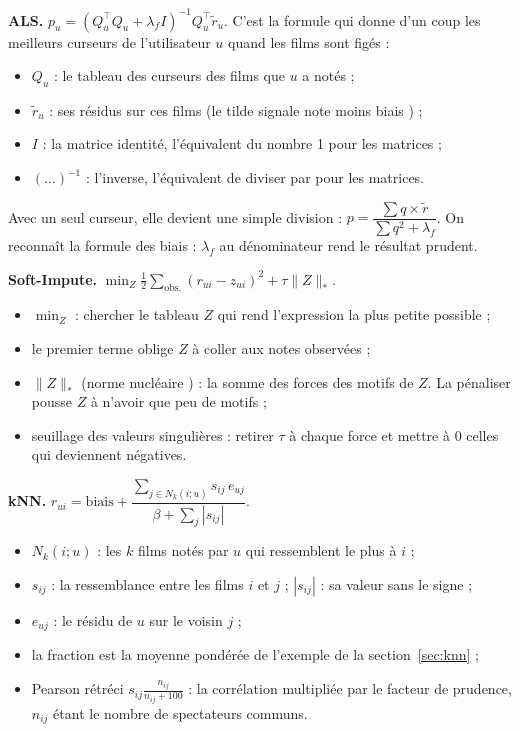 \documentclass[11pt,a4paper]{article}
\newcommand{\rhat}{\hat r}
\begin{document}
\textbf{ALS.} $p_u = (Q_u^\top Q_u + \lambda_f I)^{-1} Q_u^\top \tilde r_u$.
C'est la formule qui donne d'un coup les meilleurs curseurs de l'utilisateur $u$ quand
les films sont figés :
\begin{itemize}
  \item $Q_u$ : le tableau des curseurs des films que $u$ a notés ;
  \item $\tilde r_u$ : ses résidus sur ces films (le tilde signale \og note moins biais \fg) ;
  \item $I$ : la matrice identité, l'équivalent du nombre 1 pour les matrices ;
  \item $(\dots)^{-1}$ : l'inverse, l'équivalent de \og diviser par \fg pour les matrices.
\end{itemize}
Avec un seul curseur, elle devient une simple division :
$p = \dfrac{\sum q \times \tilde r}{\sum q^2 + \lambda_f}$. On reconnaît la formule des
biais : $\lambda_f$ au dénominateur rend le résultat prudent.

\textbf{Soft-Impute.} $\min_Z \tfrac12 \sum_{\text{obs.}} (r_{ui} - z_{ui})^2 + \tau \|Z\|_*$.
\begin{itemize}
  \item $\min_Z$ : chercher le tableau $Z$ qui rend l'expression la plus petite possible ;
  \item le premier terme oblige $Z$ à coller aux notes observées ;
  \item $\|Z\|_*$ (\og norme nucléaire \fg) : la somme des forces des motifs de $Z$. La
        pénaliser pousse $Z$ à n'avoir que peu de motifs ;
  \item \og seuillage des valeurs singulières \fg : retirer $\tau$ à chaque force et mettre
        à 0 celles qui deviennent négatives.
\end{itemize}

\textbf{kNN.} $\rhat_{ui} = \text{biais} + \dfrac{\sum_{j \in N_k(i;u)} s_{ij}\, e_{uj}}{\beta + \sum_j |s_{ij}|}$.
\begin{itemize}
  \item $N_k(i;u)$ : les $k$ films notés par $u$ qui ressemblent le plus à $i$ ;
  \item $s_{ij}$ : la ressemblance entre les films $i$ et $j$ ; $|s_{ij}|$ : sa valeur
        sans le signe ;
  \item $e_{uj}$ : le résidu de $u$ sur le voisin $j$ ;
  \item la fraction est la moyenne pondérée de l'exemple de la section~\ref{sec:knn} ;
  \item \og Pearson rétréci \fg $s_{ij} \frac{n_{ij}}{n_{ij} + 100}$ : la corrélation
        multipliée par le facteur de prudence, $n_{ij}$ étant le nombre de spectateurs communs.
\end{itemize}
\end{document}
